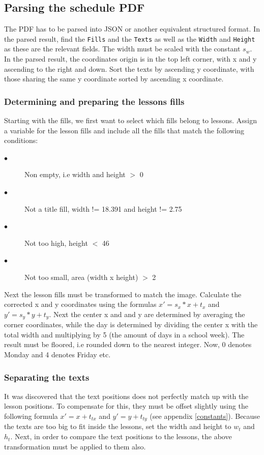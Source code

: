 \documentclass{article}
\begin{document}
	\subsection{Parsing the schedule PDF}
	The PDF has to be parsed into JSON or another equivalent structured format. In the parsed result, find the \texttt{Fills} and the \texttt{Texts} as well as the \texttt{Width} and \texttt{Height} as these are the relevant fields. The width must be scaled with the constant $s_w$. In the parsed result, the coordinates origin is in the top left corner, with x and y ascending to the right and down. Sort the texts by ascending y coordinate, with those sharing the same y coordinate sorted by ascending x coordinate.
	
	\subsubsection{Determining and preparing the lessons fills}
	Starting with the fills, we first want to select which fills belong to lessons. Assign a variable for the lesson fills and include all the fills that match the following conditions:
	\begin{description}
		\item[$\bullet$] Non empty, i.e width and height $>$ 0
		\item[$\bullet$] Not a title fill, width != 18.391 and height != 2.75
		\item[$\bullet$] Not too high, height $<$ 46
		\item[$\bullet$] Not too small, area (width x height) $>$ 2
	\end{description}
	
	Next the lesson fills must be transformed to match the image. Calculate the corrected x and y coordinates using the formulas $x' = s_x*x + t_x$ and $y' = s_y*y + t_y$. Next the center x and and y are determined by averaging the corner coordinates, while the day is determined by dividing the center x with the total width and multiplying by 5 (the amount of days in a school week). The result must be floored, i.e rounded down to the nearest integer. Now, 0 denotes Monday and 4 denotes Friday etc.
	
	\subsubsection{Separating the texts}
	It was discovered that the text positions does not perfectly match up with the lesson positions. To compensate for this, they must be offset slightly using the following formula $x' = x + t_{tx}$ and $y' = y + t_{ty}$ (see appendix \ref{constants}). Because the texts are too big to fit inside the lessons, set the width and height to $w_t$ and $h_t$. Next, in order to compare the text positions to the lessons, the above transformation must be applied to them also.
	
\end{document}
